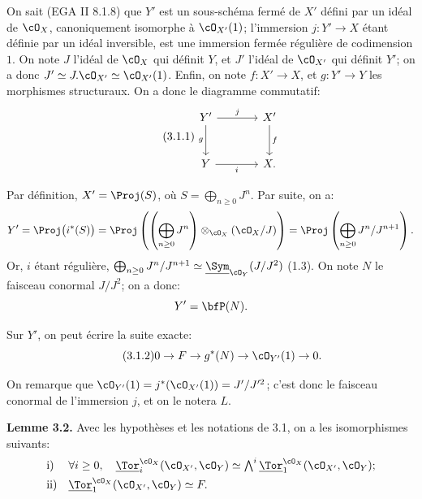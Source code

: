 On sait (EGA II 8.1.8) que \(Y'\) est un sous-schéma fermé de \(X'\) défini par un idéal de \(\cO_X\), canoniquement isomorphe à \(\cO_{X'}(1)\); l'immersion \(j:Y'\to X\) étant définie par un idéal inversible, est une immersion fermée régulière de codimension \(1\). On note \(J\) l'idéal de \(\cO_X\) qui définit \(Y\), et \(J'\) l'idéal de \(\cO_{X'}\) qui définit \(Y'\); on a donc \(J'\simeq J.\cO_{X'}\simeq\cO_{X'}(1)\). Enfin, on note \(f:X'\to X\), et \(g:Y'\to Y\) les morphismes structuraux. On a donc le diagramme commutatif:
\begin{equation}\tag{3.1.1}
\begin{tikzcd}[column sep=large,row sep=large]
Y' \arrow[r,"j"] \arrow[d,"g"'] & X' \arrow[d,"f"]\\
Y \arrow[r,"i"'] & X.
\end{tikzcd}
\end{equation}

Par définition, \(X'=\Proj(S)\), où \(S=\bigoplus_{n\ge0}J^n\). Par suite, on a:
\[
Y'=\Proj\bigl(i^*(S)\bigr)
=\Proj\left(\left(\bigoplus_{n\ge0}J^n\right)\otimes_{\cO_X}(\cO_X/J)\right)
=\Proj\left(\bigoplus_{n\ge0}J^n/J^{n+1}\right).
\]
Or, \(i\) étant régulière, \(\bigoplus_{n\ge0}J^n/J^{n+1}\simeq \underline{\Sym}_{\cO_Y}(J/J^2)\) (1.3). On note \(N\) le faisceau conormal \(J/J^2\); on a donc:
\[
Y'=\bfP(N).
\]

Sur \(Y'\), on peut écrire la suite exacte:
\begin{equation}\tag{3.1.2}
0\to F\to g^*(N)\to\cO_{Y'}(1)\to0.
\end{equation}

On remarque que \(\cO_{Y'}(1)=j^*(\cO_{X'}(1))=J'/J'^2\); c'est donc le faisceau conormal de l'immersion \(j\), et on le notera \(L\).

\textbf{Lemme 3.2.} Avec les hypothèses et les notations de 3.1, on a les isomorphismes suivants:
\[
\begin{array}{ll}
\text{i)}&
\forall i\ge0,\quad
\underline{\Tor}_i^{\cO_X}(\cO_{X'},\cO_Y)
\simeq
\bigwedge^i\underline{\Tor}_1^{\cO_X}(\cO_{X'},\cO_Y);\\[4pt]
\text{ii)}&
\underline{\Tor}_1^{\cO_X}(\cO_{X'},\cO_Y)\simeq F.
\end{array}
\]


